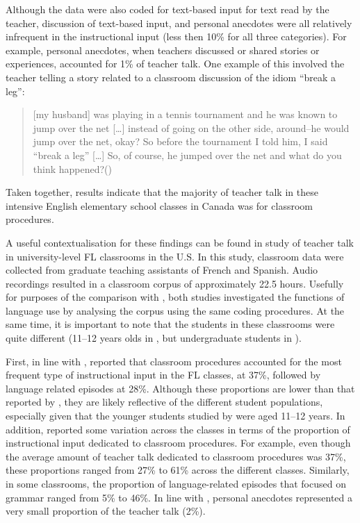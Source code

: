 \documentclass[output=paper,chinesefont]{langscibook}
\begin{document}
Although the data were also coded for text-based input for text read by the teacher, discussion of text-based input, and personal anecdotes were all relatively infrequent in the instructional input (less then 10\% for all three categories). For example, personal anecdotes, when teachers discussed or shared stories or experiences, accounted for 1\% of teacher talk. One example of this involved the teacher telling a story related to a classroom discussion of the idiom ``break a leg'': 

\begin{quote}
[my husband] was playing in a tennis tournament and he was known to jump over the net […] instead of going on the other side, around--he would jump over the net, okay? So before the tournament I told him, I said “break a leg” […] So, of course, he jumped over the net and what do you think happened?\hfill\hbox{(\citealt[78]{CollinsEtAl2012})}
\end{quote}

Taken together,  results indicate that the majority of teach\-er talk in these intensive English elementary school classes in Canada was for classroom procedures. 

A useful contextualisation for these findings can be found in  study of teacher talk in university-level FL classrooms in the U.S. In this study, classroom data were collected from graduate teaching assistants of French and Spanish. Audio recordings resulted in a classroom corpus of approximately 22.5 hours. Usefully for purposes of the comparison with \citet{CollinsEtAl2012}, both studies investigated the functions of language use by analysing the corpus using the same coding procedures. At the same time, it is important to note that the students in these classrooms were quite different (11--12 years olds in \citealt{CollinsEtAl2012}, but undergraduate students in \citealt{Huensch2019}).

First, in line with \citet{CollinsEtAl2012}, \citet{Huensch2019} reported that classroom procedures accounted for the most frequent type of instructional input in the FL classes, at 37\%, followed by language related episodes at 28\%. Although these proportions are lower than that reported by \citet{CollinsEtAl2012}, they are likely reflective of the different student populations, especially given that the younger students studied by \citet{CollinsEtAl2012} were aged 11--12 years. In addition, \citet{Huensch2019} reported some variation across the classes in terms of the proportion of instructional input dedicated to classroom procedures. For example, even though the average amount of teacher talk dedicated to classroom procedures was 37\%, these proportions ranged from 27\% to 61\% across the different classes. Similarly, in some classrooms, the proportion of language-related episodes that focused on grammar ranged from 5\% to 46\%. In line with \citet{CollinsEtAl2012}, personal anecdotes represented a very small proportion of the teacher talk (2\%). 
\end{document}
